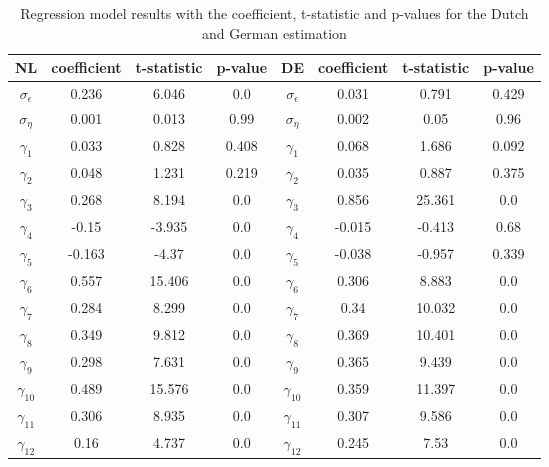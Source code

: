 \begin{table}[]
    \centering
    \begin{tabular}{|c|c c c||c|c c c|}\hline
        NL & coefficient & t-statistic & p-value & DE & coefficient & t-statistic & p-value\\\hline     
        $\sigma_{\epsilon}$ & 0.236 & 6.046 & 0.0 & $\sigma_{\epsilon}$ & 0.031 & 0.791 & 0.429\\
        $\sigma_{\eta}$ & 0.001 & 0.013 & 0.99 & $\sigma_{\eta}$ & 0.002 & 0.05 & 0.96\\
        $\gamma_{1}$ & 0.033 & 0.828 & 0.408 & $\gamma_{1}$ & 0.068 & 1.686 & 0.092\\
        $\gamma_{2}$ & 0.048 & 1.231 & 0.219 & $\gamma_{2}$ & 0.035 & 0.887 & 0.375\\
        $\gamma_{3}$ & 0.268 & 8.194 & 0.0 & $\gamma_{3}$ & 0.856 & 25.361 & 0.0\\
        $\gamma_{4}$ & -0.15 & -3.935 & 0.0 & $\gamma_{4}$ & -0.015 & -0.413 & 0.68\\
        $\gamma_{5}$ & -0.163 & -4.37 & 0.0 & $\gamma_{5}$ & -0.038 & -0.957 & 0.339\\
        $\gamma_{6}$ & 0.557 & 15.406 & 0.0 & $\gamma_{6}$ & 0.306 & 8.883 & 0.0\\
        $\gamma_{7}$ & 0.284 & 8.299 & 0.0 & $\gamma_{7}$ & 0.34 & 10.032 & 0.0\\
        $\gamma_{8}$ & 0.349 & 9.812 & 0.0 & $\gamma_{8}$ & 0.369 & 10.401 & 0.0\\
        $\gamma_{9}$ & 0.298 & 7.631 & 0.0 & $\gamma_{9}$ & 0.365 & 9.439 & 0.0\\
        $\gamma_{10}$ & 0.489 & 15.576 & 0.0 & $\gamma_{10}$ & 0.359 & 11.397 & 0.0\\
        $\gamma_{11}$ & 0.306 & 8.935 & 0.0 & $\gamma_{11}$ & 0.307 & 9.586 & 0.0\\
        $\gamma_{12}$ & 0.16 & 4.737 & 0.0 & $\gamma_{12}$ & 0.245 & 7.53 & 0.0\\\hline
    \end{tabular}
    \caption{Regression model results with the coefficient, t-statistic and p-values for the Dutch and German estimation}
    \label{tab:regression_model_results}
\end{table}
